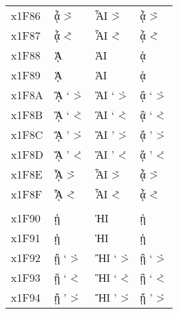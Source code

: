 \documentclass[a4paper]{article}
\newcommand*{\Greek}{\foreignlanguage{greek}}
\newcommand*{\Greek}{\ensuregreek}
\newcommand*{\Cases}[1]{%
  & \Greek{#1} & \Greek{\MakeUppercase{#1}} & \Greek{\MakeLowercase{#1}}
}
\begin{document}
\begin{longtable}{llll}
  x1F86 \Cases{ ᾆ  \accpsiliperispomeni{\alpha}\ypogegrammeni{} \~>{\alpha}\ypogegrammeni{} \>~{\alpha}\ypogegrammeni{}} \\
  x1F87 \Cases{ ᾇ  \accdasiaperispomeni{\alpha}\ypogegrammeni{} \~<{\alpha}\ypogegrammeni{} \<~{\alpha}\ypogegrammeni{}} \\
  x1F88 \Cases{ ᾈ  \accpsili{\Alpha}\ypogegrammeni{}            \>{\Alpha}\ypogegrammeni{}                             } \\
  x1F89 \Cases{ ᾉ  \accdasia{\Alpha}\ypogegrammeni{}            \<{\Alpha}\ypogegrammeni{}                             } \\
  x1F8A \Cases{ ᾊ  \accpsilivaria{\Alpha}\ypogegrammeni{}       \>`{\Alpha}\ypogegrammeni{} \`>{\Alpha}\ypogegrammeni{}} \\
  x1F8B \Cases{ ᾋ  \accdasiavaria{\Alpha}\ypogegrammeni{}       \<`{\Alpha}\ypogegrammeni{} \`<{\Alpha}\ypogegrammeni{}} \\
  x1F8C \Cases{ ᾌ  \accpsilioxia{\Alpha}\ypogegrammeni{}        \>'{\Alpha}\ypogegrammeni{} \'>{\Alpha}\ypogegrammeni{}} \\
  x1F8D \Cases{ ᾍ  \accdasiaoxia{\Alpha}\ypogegrammeni{}        \<'{\Alpha}\ypogegrammeni{} \'<{\Alpha}\ypogegrammeni{}} \\
  x1F8E \Cases{ ᾎ  \accpsiliperispomeni{\Alpha}\ypogegrammeni{} \~>{\Alpha}\ypogegrammeni{} \>~{\Alpha}\ypogegrammeni{}} \\
  x1F8F \Cases{ ᾏ  \accdasiaperispomeni{\Alpha}\ypogegrammeni{} \~<{\Alpha}\ypogegrammeni{} \<~{\Alpha}\ypogegrammeni{}} \\
                                                                                                                         \\
  x1F90 \Cases{ ᾐ  \accpsili{\eta}\ypogegrammeni{}              \>{\eta}\ypogegrammeni{}                               } \\
  x1F91 \Cases{ ᾑ  \accdasia{\eta}\ypogegrammeni{}              \<{\eta}\ypogegrammeni{}                               } \\
  x1F92 \Cases{ ᾒ  \accpsilivaria{\eta}\ypogegrammeni{}         \>`{\eta}\ypogegrammeni{}   \`>{\eta}\ypogegrammeni{}  } \\
  x1F93 \Cases{ ᾓ  \accdasiavaria{\eta}\ypogegrammeni{}         \<`{\eta}\ypogegrammeni{}   \`<{\eta}\ypogegrammeni{}  } \\
  x1F94 \Cases{ ᾔ  \accpsilioxia{\eta}\ypogegrammeni{}          \>'{\eta}\ypogegrammeni{}   \'>{\eta}\ypogegrammeni{}  } \\

\end{longtable}
\end{document}
